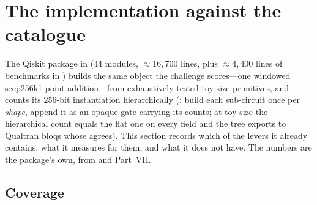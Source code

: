 \section{The  implementation against the \ecdsafail{} catalogue}\label{sec:shor-impl}

The Qiskit package in  ($44$ modules, $\approx16{,}700$ lines, plus $\approx4{,}400$ lines of benchmarks in ) builds the same object the challenge scores---one windowed secp256k1 point addition---from exhaustively tested toy-size primitives, and counts its $256$-bit instantiation hierarchically (: build each sub-circuit once per \emph{shape}, append it as an opaque gate carrying its counts; at toy size the hierarchical count equals the flat one on every field and the tree exports to Qualtran bloqs whose  agrees). This section records which of the \ecdsafail{} levers it already contains, what it measures for them, and what it does not have. The numbers are the package's own, from  and  Part~VII.

\subsection{Coverage}

